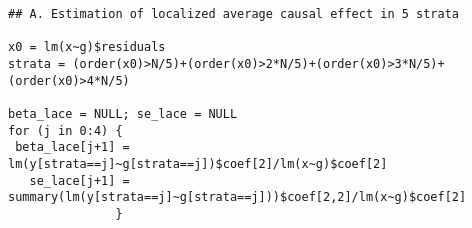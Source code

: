 \documentclass[a4paper,12pt]{article} %
\begin{document}
\begin{lstlisting}
## A. Estimation of localized average causal effect in 5 strata

x0 = lm(x~g)$residuals
strata = (order(x0)>N/5)+(order(x0)>2*N/5)+(order(x0)>3*N/5)+(order(x0)>4*N/5)

beta_lace = NULL; se_lace = NULL
for (j in 0:4) {
 beta_lace[j+1] = lm(y[strata==j]~g[strata==j])$coef[2]/lm(x~g)$coef[2]
   se_lace[j+1] = summary(lm(y[strata==j]~g[strata==j]))$coef[2,2]/lm(x~g)$coef[2]
               }
\end{lstlisting}


\clearpage




\makeatletter
\renewcommand\@biblabel[1]{}
\makeatother


\end{document}
